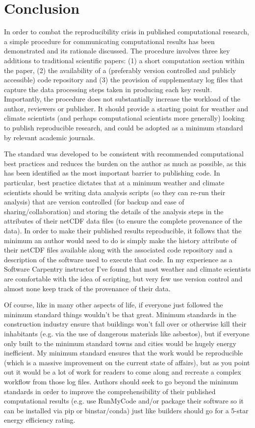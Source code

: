 \section{Conclusion}

In order to combat the reproducibility crisis in published computational research, a simple procedure for communicating computational results has been demonstrated \citep{Irving2015} and its rationale discussed. The procedure involves three key additions to traditional scientific papers: (1) a short computation section within the paper, (2) the availability of a (preferably version controlled and publicly accessible) code repository and (3) the provision of supplementary log files that capture the data processing steps taken in producing each key result. Importantly, the procedure does not substantially increase the workload of the author, reviewers or publisher. It should provide a starting point for weather and climate scientists (and perhaps computational scientists more generally) looking to publish reproducible research, and could be adopted as a minimum standard by relevant academic journals.

The standard was developed to be consistent with recommended computational best practices and reduces the burden on the author as much as possible, as this has been identified as the most important barrier to publishing code. In particular, best practice dictates that at a minimum weather and climate scientists should be writing data analysis scripts (so they can re-run their analysis) that are version controlled (for backup and ease of sharing/collaboration) and storing the details of the analysis steps in the attributes of their netCDF data files (to ensure the complete provenance of the data). In order to make their published results reproducible, it follows that the minimum an author would need to do is simply make the history attribute of their netCDF files available along with the associated code repository and a description of the software used to execute that code. In my experience as a Software Carpentry instructor I've found that most weather and climate scientists are comfortable with the idea of scripting, but very few use version control and almost none keep track of the provenance of their data. 

Of course, like in many other aspects of life, if everyone just followed the minimum standard things wouldn't be that great. Minimum standards in the construction industry ensure that buildings won't fall over or otherwise kill their inhabitants (e.g. via the use of dangerous materials like asbestos), but if everyone only built to the minimum standard towns and cities would be hugely energy inefficient. My minimum standard ensures that the work would be reproducible (which is a massive improvement on the current state of affairs), but as you point out it would be a lot of work for readers to come along and recreate a complex workflow from those log files. Authors should seek to go beyond the minimum standards in order to improve the comprehensibility of their published computational results (e.g. use RunMyCode and/or package their software so it can be installed via pip or binstar/conda) just like builders should go for a 5-star energy efficiency rating.

